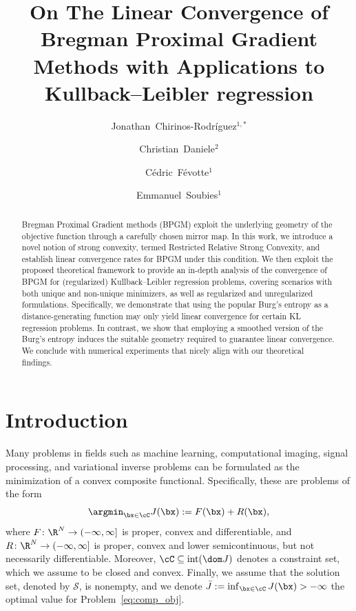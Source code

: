 \documentclass[11pt]{amsart}
\title[Bregman Proximal Gradient Methods for KL Regression]{On The Linear Convergence of Bregman Proximal Gradient Methods with Applications to Kullback--Leibler regression}
\author[J.\ Chirinos-Rodriguez]{Jonathan\ Chirinos-Rodríguez${}^{1,*}$}
\author[C.\ Daniele]{Christian\ Daniele${}^{2}$}
\author[C.\ Févotte]{Cédric\ Févotte${}^{1}$}
\author[E.\ Soubies]{Emmanuel\ Soubies${}^{1}$}
\makeatletter
\let\oldmaketitle\maketitle
\renewcommand{\maketitle}{%
  \oldmaketitle
  \vspace{-2cm}
  \begingroup
    \parindent=0pt
    \begin{center}
     \@setaddresses
    \end{center}
  \endgroup
  \global\let\@setaddresses\relax
}
\makeatother
\begin{document}
\sloppy
\maketitle

\begin{abstract}
Bregman Proximal Gradient methods (BPGM) exploit the underlying geometry of the objective function through a carefully chosen mirror map. In this work, we introduce a novel notion of strong convexity, termed Restricted Relative Strong Convexity, and establish linear convergence rates for BPGM under this condition. We then exploit the proposed theoretical framework to provide an in-depth analysis of the convergence of BPGM for (regularized) Kullback--Leibler regression problems, covering scenarios with both unique and non-unique minimizers, as well as regularized and unregularized formulations. Specifically, we demonstrate that using the popular Burg's entropy as a distance-generating function may only yield linear convergence for certain KL regression problems. In contrast, we show that employing a smoothed version of the Burg's entropy induces the suitable geometry required to guarantee linear convergence. We conclude with numerical experiments that nicely align with our theoretical findings.
\end{abstract}



\section{Introduction}
Many problems in fields such as machine learning, computational imaging, signal processing, and variational inverse problems can be formulated as the minimization of a convex composite functional. Specifically, these are problems of the form
\begin{equation}\label{eq:comp_obj}
    \argmin_{\bx \in \cC} J(\bx):=F(\bx) + R(\bx),
\end{equation}
where $F\colon\R^N\to(-\infty,\infty]$ is proper, convex and differentiable, and $R\colon\R^N\to(-\infty,\infty]$ is proper, convex and lower semicontinuous, but not necessarily differentiable. Moreover, $\cC\subseteq \mathrm{int}(\dom J)$ denotes a constraint set, which we assume to be closed and convex. Finally, we assume that the solution set, denoted by $\mathcal{S}$, is nonempty, and we denote $\bar J:=\inf_{\bx\in\cC}J(\bx)>-\infty$ the optimal value for Problem~\cref{eq:comp_obj}. \\
\end{document}
